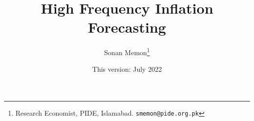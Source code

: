 \documentclass[12pt]{article}
\newcommand{\1}{\mathbbm 1}
\begin{document}
	
	
	
	
	
	
	\vspace{-0.5ex}
	
	
	
	
	
	
	
	
	\newpage{}
	
	
	
	
	
	
	\title{{High Frequency Inflation Forecasting  %
			}}
			
			
			
			\date{This version: July 2022}%
		
		
		\author{Sonan Memon\footnote{Research Economist, PIDE, Islamabad. \texttt{smemon@pide.org.pk}}}
		
		
		
		\newpage{}
		
		\maketitle
		\vspace{-2ex}
		
		
		
		
		
		
		
		
		
\end{document}
